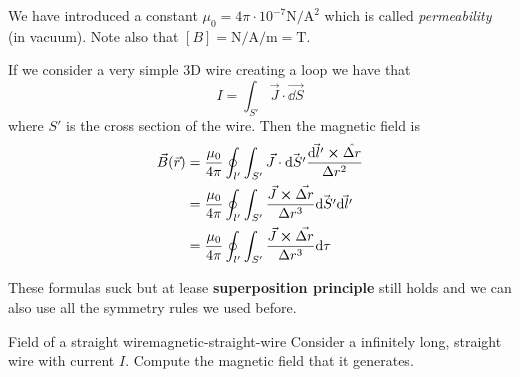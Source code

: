 \documentclass[12pt]{extarticle}
\begin{document}
We have introduced a constant $\mu_0 = 4 \pi \cdot 10^{-7} \si{\newton \per \ampere \squared}$
which is called \emph{permeability} (in vacuum).
Note also that $[B] = \si{\newton \per \ampere \per \meter} = \si{\tesla}$.

If we consider a very simple 3D wire creating a loop we have that
\begin{equation}
    I = \int_{S'} \vec J \cdot \vec{\dd S}
\end{equation}
where $S'$ is the cross section of the wire.
Then the magnetic field is
\begin{align}
    \vec B(\vec r) & = \frac{\mu_0}{4 \pi} \oint_{l'} \int_{S'} \vec J \cdot \vec{\dd S'} \frac{\vec{\dd l'} \cross \hat{\Delta r}}{\Delta r^2} \\
                   & = \frac{\mu_0}{4 \pi} \oint_{l'} \int_{S'} \frac{\vec J \cross \vec{\Delta r}}{\Delta r^3} \vec{\dd S'} \vec{\dd l'}       \\
                   & = \frac{\mu_0}{4 \pi} \oint_{l'} \int_{S'} \frac{\vec J \cross \vec{\Delta r}}{\Delta r^3} \dd \tau
\end{align}

These formulas suck but at lease \textbf{superposition principle} still holds
and we can also use all the symmetry rules we used before.

\begin{example}{Field of a straight wire}{magnetic-straight-wire}
    Consider a infinitely long, straight wire with current $I$.
    Compute the magnetic field that it generates.
\end{example}
\end{document}
